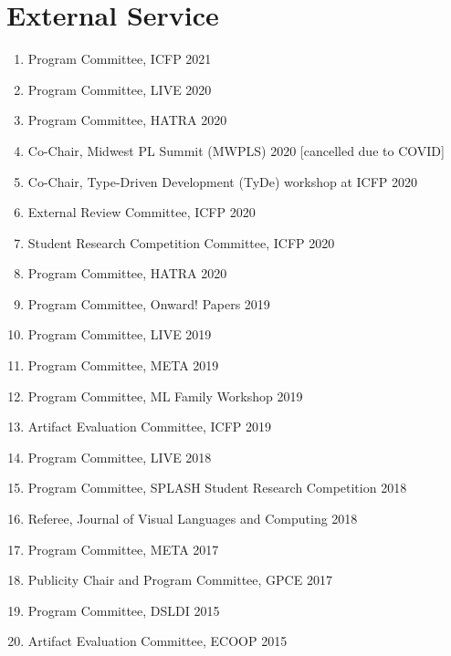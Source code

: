 \documentclass[10pt,letterpaper]{article}
\begin{document}
\section*{External Service}
\begin{enumerate}
  \item Program Committee, ICFP 2021
  \item Program Committee, LIVE 2020
  \item Program Committee, HATRA 2020
  \item Co-Chair, Midwest PL Summit (MWPLS) 2020 [cancelled due to COVID]
  \item Co-Chair, Type-Driven Development (TyDe) workshop at ICFP 2020
  \item External Review Committee, ICFP 2020
  \item Student Research Competition Committee, ICFP 2020
  \item Program Committee, HATRA 2020
  \item Program Committee, Onward! Papers 2019	
  \item Program Committee, LIVE 2019
  \item Program Committee, META 2019
  \item Program Committee, ML Family Workshop 2019
  \item Artifact Evaluation Committee, ICFP 2019
  \item Program Committee, LIVE 2018
  \item Program Committee, SPLASH Student Research Competition 2018
  \item Referee, Journal of Visual Languages and Computing 2018
  \item Program Committee, META 2017
  \item Publicity Chair and Program Committee, GPCE 2017
  \item Program Committee, DSLDI 2015
  \item Artifact Evaluation Committee, ECOOP 2015
\end{enumerate}
\end{document}
